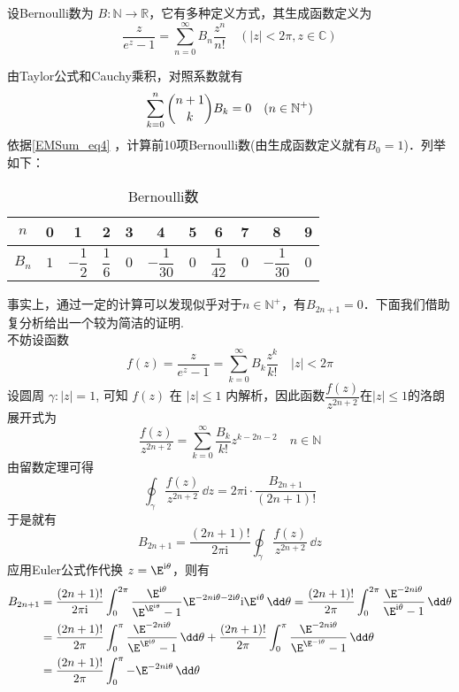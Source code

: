 \begin{definition}{}
设Bernoulli数为 $B:\mathbb{N}\to\mathbb{R} $，它有多种定义方式，其生成函数定义为
\begin{equation}
    \frac{z}{e^{z}-1}=\sum_{n=0}^{\infty}B_{n}\frac{z^{n}}{n!}
    \quad(|z|<2\pi,z\in{\mathbb C})
\end{equation}
\end{definition}
由Taylor公式和Cauchy乘积，对照系数就有
\begin{equation}\label{EMSum_eq4}
    \sum_{k=0}^{n}\dbinom{n+1}{k}B_{k}=0\quad(n\in{\mathbb N^{+}})
\end{equation}
依据\autoref{EMSum_eq4} ，计算前10项Bernoulli数(由生成函数定义就有$B_{0}=1$)．列举如下：
\begin{table}[ht]
\centering
\caption{Bernoulli数}
\begin{tabular}{|c|c|c|c|c|c|c|c|c|c|c|}
\hline
$ n $ & 0 & 1 & 2 & 3 & 4 & 5 & 6 & 7 & 8 & 9\\ 
\hline
$ B_{n} $ & $1$ & $-\dfrac{1}{2}$ & $ \dfrac{1}{6}$ & $0$ & $-\dfrac{1}{30}$ & $0$ & $\dfrac{1}{42}$ & $0$ & $-\dfrac{1}{30}$ & $0$\\
\hline
\end{tabular}
\end{table}
事实上，通过一定的计算可以发现似乎对于$n\in\mathbb N^+$，有$B_{2n+1}=0$．下面我们借助复分析给出一个较为简洁的证明.\\
不妨设函数
\[
f(z)=\frac{z}{e^{z}-1}=\sum_{k=0}^{\infty}B_{k}\frac{z^{k}}{k!}\quad|z|<2\pi
\]
设圆周 $\gamma:|z|=1$, 可知 $f(z)$ 在 $|z|\leq 1$ 内解析，因此函数$\dfrac{f(z)}{z^{2n+2}}$在$|z|\leq 1$的洛朗展开式为
\[
\frac{f(z)}{z^{2n+2}}=\sum_{k=0}^{\infty}\frac{B_{k}}{k!}{z^{k-2n-2}}\quad n\in\mathbb N
\]
由留数定理可得
\[
\oint_{\gamma}\frac{f(z)}{z^{2 n+2}}\,\dd z=2\pi\mathrm i\cdot\frac{B_{2 n+1}}{(2n+1)!}
\]
于是就有
\[
B_{2n+1}=\frac{(2n+1)!}{2\pi\mathrm i}\oint_{\gamma}\frac{f(z)}{z^{2 n+2}}\,\dd z
\]
应用Euler公式作代换 $z=\E^{\mathrm i\theta}$，则有
$$
\begin{aligned}
B_{2n+1}&=\frac{(2n+1)!}{2\pi\mathrm i}\int_{0}^{2\pi}\frac{\E^{\mathrm i\theta}}{\E^{\E^{\mathrm i\theta}}-1}\E^{-2n\mathrm i\theta-2\mathrm i\theta}\mathrm i\E^{i \theta}\,\dd\theta
=\frac{(2n+1)!}{2\pi}\int_{0}^{2\pi}\frac{\E^{-2n\mathrm i\theta}}{\E^{\mathrm i\theta}-1}\,\dd\theta\\
&=\frac{(2n+1)!}{2\pi}\int_{0}^{\pi}\frac{\E^{-2n\mathrm i\theta}}{\E^{\E^{\mathrm i\theta}}-1}\,\dd \theta+\frac{(2n+1)!}{2\pi}\int_{0}^{\pi} \frac{\E^{-2n\mathrm i\theta}}{\E^{\E^{-\mathrm i\theta}}-1}\,\dd \theta\\
&=\frac{(2 n+1)!}{2\pi}\int_{0}^{\pi}-\E^{-2n\mathrm i\theta}\,\dd\theta
\end{aligned}
$$
